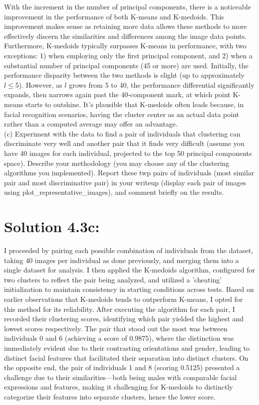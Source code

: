 \documentclass[10pt]{article}
\begin{document}
With the increment in the number of principal components, there is a noticeable improvement in the performance of both K-means and K-medoids. This improvement makes sense as retaining more data allows these methods to more effectively discern the similarities and differences among the image data points. Furthermore, K-medoids typically surpasses K-means in performance, with two exceptions: 1) when employing only the first principal component, and 2) when a substantial number of principal components (45 or more) are used. Initially, the performance disparity between the two methods is slight (up to approximately \(l \leq 5\)). However, as \(l\) grows from 5 to 40, the performance differential significantly expands, then narrows again past the 40-component mark, at which point K-means starts to outshine. It's plausible that K-medoids often leads because, in facial recognition scenarios, having the cluster center as an actual data point rather than a computed average may offer an advantage. \\


(c) Experiment with the data to find a pair of individuals that clustering can discriminate very well and another pair that it finds very difficult (assume you have 40 images for each individual, projected to the top 50 principal components space). Describe your methodology (you may choose any of the clustering algorithms you implemented). Report these twp pairs of individuals (most similar pair and most discriminative pair) in your writeup (display each pair of images using plot\_representative\_images), and comment briefly on the results.

\section*{Solution 4.3c:}

I proceeded by pairing each possible combination of individuals from the dataset, taking 40 images per individual as done previously, and merging them into a single dataset for analysis. I then applied the K-medoids algorithm, configured for two clusters to reflect the pair being analyzed, and utilized a 'cheating' initialization to maintain consistency in starting conditions across tests. Based on earlier observations that K-medoids tends to outperform K-means, I opted for this method for its reliability. After executing the algorithm for each pair, I recorded their clustering scores, identifying which pair yielded the highest and lowest scores respectively. The pair that stood out the most was between individuals 0 and 6 (achieving a score of 0.9875), where the distinction was immediately evident due to their contrasting orientations and gender, leading to distinct facial features that facilitated their separation into distinct clusters. On the opposite end, the pair of individuals 1 and 8 (scoring 0.5125) presented a challenge due to their similarities—both being males with comparable facial expressions and features, making it challenging for K-medoids to distinctly categorize their features into separate clusters, hence the lower score. \\
\end{document}
